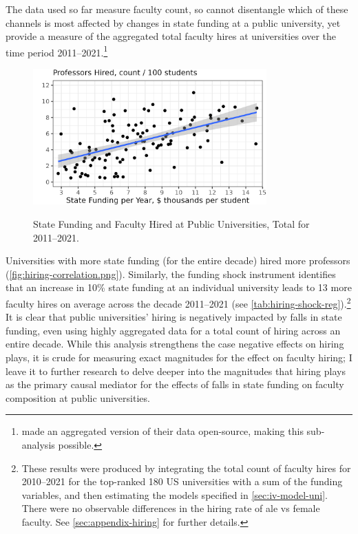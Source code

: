 The data used so far measure faculty count, so cannot disentangle which of these channels is most affected by changes in state funding at a public university, yet \cite{wapman2022quantifying} provide a measure of the aggregated total faculty hires at universities over the time period 2011--2021.\footnote{
    \citep{wapman2022quantifying} made an aggregated version of their data open-source, making this sub-analysis possible.
}
\begin{figure}[h!]
    \centering
    \singlespacing
    \caption{State Funding and Faculty Hired at Public Universities, Total for 2011--2021.}
    \includegraphics[width=0.8\textwidth]{figures/hiring-correlation.png}
    \label{fig:hiring-correlation.png}
\end{figure}

Universities with more state funding (for the entire decade) hired more professors (\autoref{fig:hiring-correlation.png}).
Similarly, the funding shock instrument identifies that an increase in 10\% state funding at an individual university leads to 13 more faculty hires on average across the decade 2011--2021 (see \autoref{tab:hiring-shock-reg}).\footnote{
    These results were produced by integrating the total count of faculty hires for 2010--2021 for the top-ranked 180 US universities with a sum of the funding variables, and then estimating the models specified in \autoref{sec:iv-model-uni}.
    There were no observable differences in the hiring rate of ale vs female faculty.
    See \autoref{sec:appendix-hiring} for further details.
}
It is clear that public universities' hiring is negatively impacted by falls in state funding, even using highly aggregated data for a total count of hiring across an entire decade.
While this analysis strengthens the case negative effects on hiring plays, it is crude for measuring exact magnitudes for the effect on faculty hiring; I leave it to further research to delve deeper into the magnitudes that hiring plays as the primary causal mediator for the effects of falls in state funding on faculty composition at public universities.
